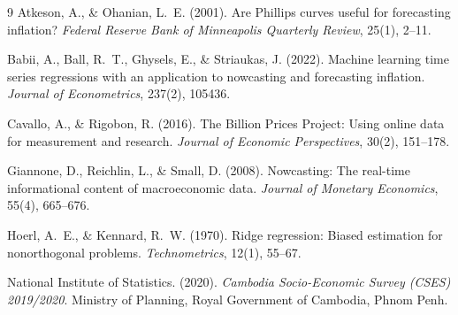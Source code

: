 \documentclass[a4paper, 11pt]{article}
\begin{document}
\vspace{0.6cm}
\begin{thebibliography}{9}
Atkeson, A., \& Ohanian, L.~E. (2001).
\newblock Are Phillips curves useful for forecasting inflation?
\newblock \emph{Federal Reserve Bank of Minneapolis Quarterly Review}, 25(1), 2--11.

Babii, A., Ball, R.~T., Ghysels, E., \& Striaukas, J. (2022).
\newblock Machine learning time series regressions with an application to nowcasting and forecasting inflation.
\newblock \emph{Journal of Econometrics}, 237(2), 105436.

Cavallo, A., \& Rigobon, R. (2016).
\newblock The Billion Prices Project: Using online data for measurement and research.
\newblock \emph{Journal of Economic Perspectives}, 30(2), 151--178.

Giannone, D., Reichlin, L., \& Small, D. (2008).
\newblock Nowcasting: The real-time informational content of macroeconomic data.
\newblock \emph{Journal of Monetary Economics}, 55(4), 665--676.

Hoerl, A.~E., \& Kennard, R.~W. (1970).
\newblock Ridge regression: Biased estimation for nonorthogonal problems.
\newblock \emph{Technometrics}, 12(1), 55--67.

National Institute of Statistics. (2020).
\newblock \emph{Cambodia Socio-Economic Survey (CSES) 2019/2020}.
\newblock Ministry of Planning, Royal Government of Cambodia, Phnom Penh.
\end{thebibliography}
\end{document}
